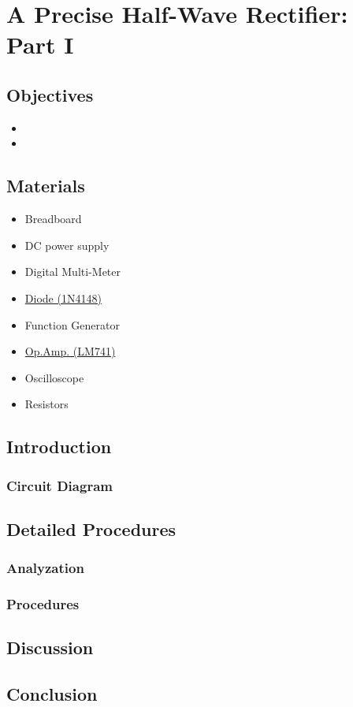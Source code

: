 \chapter{A Precise Half-Wave Rectifier: Part I}


\section{Objectives}
\begin{itemize}
    \item 
    \item 
\end{itemize}

\section{Materials}
\begin{itemize}
    \item Breadboard
    \item DC power supply
    \item Digital Multi-Meter
    \item \hyperref[1N4148]{Diode (1N4148)}
    \item Function Generator
    \item \hyperref[LM741_1]{Op.Amp. (LM741)}
    \item Oscilloscope
    \item Resistors
\end{itemize}

\section{Introduction}
    \subsection{Circuit Diagram}


\section{Detailed Procedures}
    \subsection{Analyzation}


    \subsection{Procedures}

    
\section{Discussion}


\section{Conclusion}